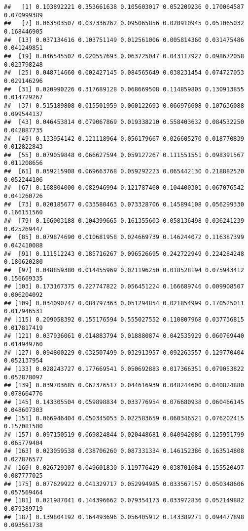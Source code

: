 \documentclass[
]{article}
\begin{document}
\begin{verbatim}
##   [1] 0.103892221 0.353661638 0.105603017 0.052209236 0.170064587 0.070999389
##   [7] 0.063503507 0.037336262 0.095065856 0.020910945 0.051065032 0.168446905
##  [13] 0.037134616 0.103751149 0.012561006 0.005814360 0.031475486 0.041249851
##  [19] 0.046545502 0.020557693 0.063725047 0.043117927 0.098672058 0.023798248
##  [25] 0.048714660 0.002427145 0.084565649 0.038231454 0.074727053 0.029146296
##  [31] 0.020990226 0.317689128 0.068669508 0.114859805 0.130913855 0.014729267
##  [37] 0.515189808 0.015501959 0.060122693 0.066976608 0.107636088 0.099544137
##  [43] 0.046453814 0.079067869 0.019338210 0.558403632 0.084532250 0.042887735
##  [49] 0.133954142 0.121118964 0.056179667 0.026605270 0.018770839 0.012822843
##  [55] 0.079059848 0.066627594 0.059127267 0.111551551 0.098391567 0.011208656
##  [61] 0.059215908 0.069663768 0.059292223 0.065442130 0.218882520 0.052244106
##  [67] 0.168804000 0.082946994 0.121787460 0.104400301 0.067076542 0.041260726
##  [73] 0.020185677 0.033580463 0.073328706 0.145894108 0.056299330 0.166151560
##  [79] 0.166003188 0.104399665 0.161355603 0.058136498 0.036241239 0.025269447
##  [85] 0.079874690 0.010681958 0.024669739 0.146244072 0.116387399 0.042410088
##  [91] 0.111512243 0.185716267 0.096526695 0.242722949 0.224284248 0.180620280
##  [97] 0.048859380 0.014455969 0.021196250 0.018528194 0.075943412 0.156669335
## [103] 0.173167375 0.227747822 0.056451224 0.166689746 0.009908507 0.006204092
## [109] 0.034090747 0.084797363 0.051294854 0.021854999 0.170525011 0.017946531
## [115] 0.209058392 0.155176594 0.555027552 0.110807968 0.037736815 0.017817419
## [121] 0.037936061 0.014883794 0.018880874 0.042535929 0.060769440 0.014949760
## [127] 0.094800229 0.032507499 0.032913957 0.092263557 0.129770404 0.052137954
## [133] 0.028243727 0.177669541 0.050692883 0.017366351 0.079053822 0.052878097
## [139] 0.039703685 0.062376517 0.044616939 0.048244600 0.040824880 0.078664776
## [145] 0.143305504 0.059898834 0.033776954 0.076680938 0.060466145 0.048607303
## [151] 0.066946404 0.050345053 0.022583659 0.060346521 0.076202415 0.157081500
## [157] 0.097150519 0.069824844 0.020448681 0.040942086 0.125951799 0.065779404
## [163] 0.023059538 0.038706260 0.087331334 0.146152386 0.163514808 0.027876577
## [169] 0.026729307 0.049601830 0.119776429 0.038701684 0.155520497 0.087777025
## [175] 0.077629922 0.041329717 0.052994985 0.033567157 0.050348606 0.057569464
## [181] 0.021987041 0.144396662 0.079354173 0.033972836 0.052149882 0.079389719
## [187] 0.139804192 0.164493696 0.056405912 0.143389271 0.094477898 0.093561738

\end{verbatim}
\end{document}

